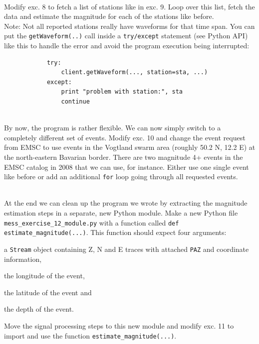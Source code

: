 \documentclass{LMUexercise}
\begin{document}
\\
Modify exc. 8 to fetch a list of stations like in exc. 9. Loop over this list,
fetch the data and estimate the magnitude for each of the stations like
before.\\
Note: Not all reported stations really have waveforms for that time span. You
can put the \verb#getWaveform(..)# call inside a \verb#try/except# statement
(see Python API) like this to handle the error and avoid the program execution
being interrupted:
{\footnotesize
\begin{verbatim}
            try:
                client.getWaveform(..., station=sta, ...)
            except:
                print "problem with station:", sta
                continue
\end{verbatim}
}
\vspace*{2.0em}

\\
By now, the program is rather flexible. We can now simply switch to a
completely different set of events. Modify exc. 10 and change the event request
from EMSC to use events in the Vogtland swarm area (roughly 50.2 N, 12.2 E) at
the north-eastern Bavarian border. There are two magnitude 4+ events in the
EMSC catalog in 2008 that we can use, for instance. Either use one single event
like before or add an additional \verb#for# loop going through all requested
events.
\vspace*{3.0em}

\\
At the end we can clean up the program we wrote by extracting the magnitude
estimation steps in a separate, new Python module. Make a new Python file
\verb#mess_exercise_12_module.py# with a function called
\verb#def estimate_magnitude(...)#. This function should expect four arguments:
\begin{inparaenum} \item a \verb#Stream# object containing
Z, N and E traces with attached \verb#PAZ# and coordinate information, \item
the longitude of the event, \item the latitude of the event and \item the depth
of the event. \end{inparaenum} Move the signal processing steps to this new
module and modify exc. 11 to import and use the function
\verb#estimate_magnitude(...)#.
\vspace*{3.0em}
\end{document}
